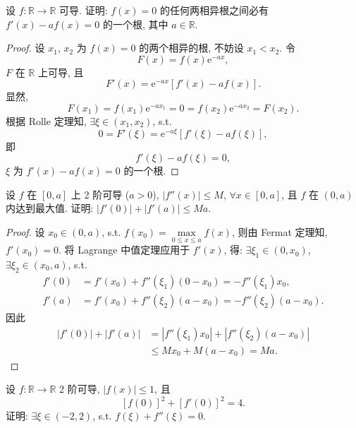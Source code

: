 \begin{example}\label{ex:3.3.6}
设 $f:\mathbb{R}\to\mathbb{R}$ 可导. 证明: $f(x)=0$ 的任何两相异根之间必有 $f'(x)-af(x)=0$ 的一个根, 其中 $a\in\mathbb{R}$.
\end{example}

\begin{proof}
设 $x_1$, $x_2$ 为 $f(x)=0$ 的两个相异的根, 不妨设 $x_1<x_2$. 令
\[
F(x)=f(x)\mathrm{e}^{-ax},
\]
$F$ 在 $\mathbb{R}$ 上可导, 且
\[
F'(x)=\mathrm{e}^{-ax}[f'(x)-af(x)].
\]
显然,
\[
F(x_1)=f(x_1)\mathrm{e}^{-ax_1}=0=f(x_2)\mathrm{e}^{-ax_2}=F(x_2).
\]
根据 Rolle 定理知, $\exists\xi\in(x_1,x_2)$, s.t.
\[
0=F'(\xi)=\mathrm{e}^{-a\xi}[f'(\xi)-af(\xi)],
\]
即
\[
f'(\xi)-af(\xi)=0,
\]
$\xi$ 为 $f'(x)-af(x)=0$ 的一个根.
\end{proof}

\begin{example}\label{ex:3.3.7}
设 $f$ 在 $[0,a]$ 上 2 阶可导 ($a>0$), $|f''(x)|\leqslant M$, $\forall x\in[0,a]$, 且 $f$ 在 $(0,a)$ 内达到最大值. 证明: $|f'(0)|+|f'(a)|\leqslant Ma$.
\end{example}

\begin{proof}
设 $x_0\in(0,a)$, s.t. $f(x_0)=\max\limits_{0\leqslant x\leqslant a}f(x)$, 则由 Fermat 定理知, $f'(x_0)=0$. 将 Lagrange 中值定理应用于 $f'(x)$, 得: $\exists\xi_1\in(0,x_0)$, $\exists\xi_2\in(x_0,a)$, s.t.
\[
\begin{aligned}
f'(0)&=f'(x_0)+f''(\xi_1)(0-x_0)=-f''(\xi_1)x_0,\\
f'(a)&=f'(x_0)+f''(\xi_2)(a-x_0)=-f''(\xi_2)(a-x_0).
\end{aligned}
\]
因此
\[
\begin{aligned}
|f'(0)|+|f'(a)|&=|f''(\xi_1)x_0|+|f''(\xi_2)(a-x_0)|\\
&\leqslant Mx_0+M(a-x_0)=Ma.
\end{aligned}
\]
\end{proof}

\begin{example}\label{ex:3.3.8}
设 $f:\mathbb{R}\to\mathbb{R}$ 2 阶可导, $|f(x)|\leqslant1$, 且
\[
[f(0)]^{2}+[f'(0)]^{2}=4.
\]
证明: $\exists\xi\in(-2,2)$, s.t. $f(\xi)+f''(\xi)=0$.
\end{example}

